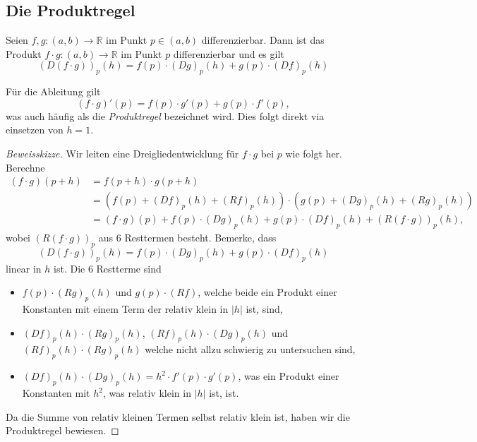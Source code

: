 \documentclass[../main.tex]{subfiles}
\begin{document}
\subsection*{Die Produktregel}
\begin{productrule}
Seien $f, g \colon (a, b) \to \mathbb{R}$ 
im Punkt $p \in (a, b)$ differenzierbar.
Dann ist das Produkt
$f \cdot g \colon (a, b) \to \mathbb{R}$ 
im Punkt $p$ differenzierbar und es gilt
\[
  {(D(f \cdot g))}_p(h) = f(p) \cdot
  {(Dg)}_p(h) + g(p) \cdot {(Df)}_p(h)
\]
\end{productrule}

\begin{remark}
  Für die Ableitung gilt
  \[
    {(f\cdot g)}'(p) = f(p) \cdot g'(p) + g(p) \cdot f'(p),
  \]
  was auch häufig als die \emph{Produktregel}
  bezeichnet wird.
  Dies folgt direkt via einsetzen von $h = 1$.
\end{remark}

\begin{proof}[Beweisskizze]
  Wir leiten eine Dreigliedentwicklung für $f \cdot g$ 
  bei $p$ wie folgt her. Berechne
  \begin{align*}
    (f \cdot g) (p+h)
    & = f(p+h) \cdot g(p+h)\\
    &= \left( f(p) + {(Df)}_p(h) + {(Rf)}_p(h) \right)
    \cdot \left( g(p) + {(Dg)}_p(h) + {(Rg)}_p(h) \right) \\
    &= (f \cdot g)(p)
    + f(p) \cdot {(Dg)}_p(h) + g(p) \cdot {(Df)}_p(h)
    + {(R(f \cdot g))}_p(h),
  \end{align*}
  wobei ${(R(f \cdot g))}_p$ aus $6$ Resttermen
  besteht.
  Bemerke, dass
  \[
    {(D(f \cdot g))}_p(h) = f(p) \cdot {(Dg)}_p(h)
    + g(p) \cdot {(Df)}_p(h)
  \]
  linear in $h$ ist.
  Die $6$ Restterme sind
  \begin{itemize}
    \item $f(p) \cdot {(Rg)}_p(h)$ und
      $g(p) \cdot {(Rf)}$, welche beide
      ein Produkt einer Konstanten
      mit einem Term der relativ klein in $|h|$ ist, sind,
    \item ${(Df)}_p(h) \cdot {(Rg)}_p(h)$,
      ${(Rf)}_p(h) \cdot {(Dg)}_p(h)$ und
      ${(Rf)}_p(h) \cdot {(Rg)}_p(h)$
      welche nicht allzu schwierig zu untersuchen sind,
    \item ${(Df)}_p(h) \cdot {(Dg)}_p(h) = h^2
      \cdot f'(p) \cdot g'(p)$, was ein Produkt
      einer Konstanten
      mit $h^2$, was relativ klein in $|h|$ ist, ist.
  \end{itemize}
  Da die Summe von relativ kleinen Termen selbst relativ
  klein ist, haben wir die Produktregel bewiesen.
\end{proof}
\end{document}
